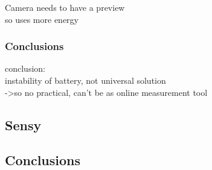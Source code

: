 	Camera needs to have a preview\\
		so uses more energy\\
   
   
\subsubsection{Conclusions}   
conclusion:\\
	instability of battery, not universal solution\\
		->so no practical, can't be as online measurement tool\\

\subsection{Sensy}
\subsection{Conclusions}